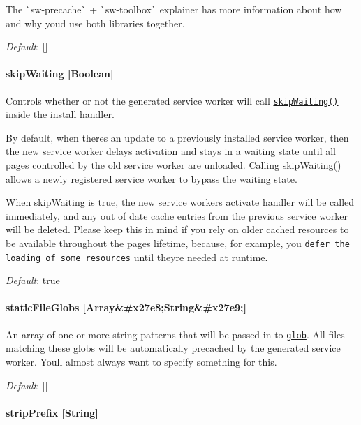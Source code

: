 The \`{}sw-\/precache\`{} + \`{}sw-\/toolbox\`{} explainer has more information about how and why you\textquotesingle{}d use both libraries together.

{\itshape Default}\+: {\ttfamily \mbox{[}\mbox{]}}

\paragraph*{skip\+Waiting \mbox{[}Boolean\mbox{]}}

Controls whether or not the generated service worker will call \href{https://developer.mozilla.org/en-US/docs/Web/API/ServiceWorkerGlobalScope/skipWaiting}{\tt {\ttfamily skip\+Waiting()}} inside the {\ttfamily install} handler.

By default, when there\textquotesingle{}s an update to a previously installed service worker, then the new service worker delays activation and stays in a {\ttfamily waiting} state until all pages controlled by the old service worker are unloaded. Calling {\ttfamily skip\+Waiting()} allows a newly registered service worker to bypass the {\ttfamily waiting} state.

When {\ttfamily skip\+Waiting} is {\ttfamily true}, the new service worker\textquotesingle{}s {\ttfamily activate} handler will be called immediately, and any out of date cache entries from the previous service worker will be deleted. Please keep this in mind if you rely on older cached resources to be available throughout the page\textquotesingle{}s lifetime, because, for example, you \href{https://github.com/GoogleChrome/sw-precache/issues/180}{\tt defer the loading of some resources} until they\textquotesingle{}re needed at runtime.

{\itshape Default}\+: {\ttfamily true}

\paragraph*{static\+File\+Globs \mbox{[}Array\&\#x27e8;String\&\#x27e9;\mbox{]}}

An array of one or more string patterns that will be passed in to \href{https://github.com/isaacs/node-glob}{\tt {\ttfamily glob}}. All files matching these globs will be automatically precached by the generated service worker. You\textquotesingle{}ll almost always want to specify something for this.

{\itshape Default}\+: {\ttfamily \mbox{[}\mbox{]}}

\paragraph*{strip\+Prefix \mbox{[}String\mbox{]}}

